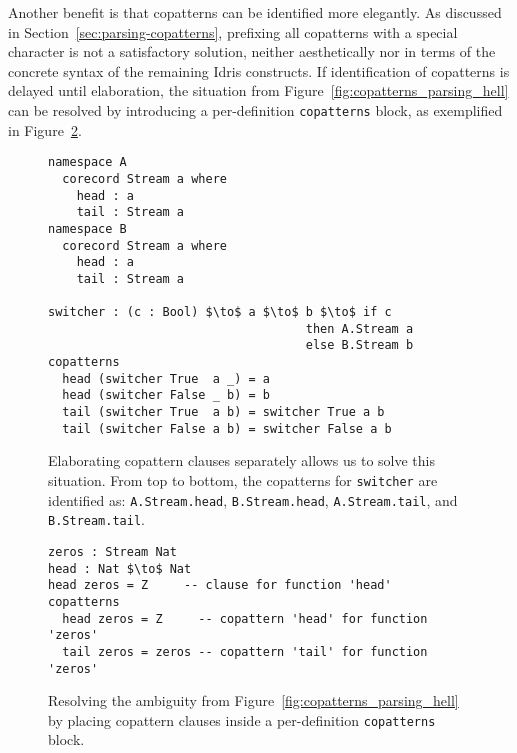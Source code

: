 Another benefit is that copatterns can be identified more
elegantly. As discussed in Section~\ref{sec:parsing-copatterns}, prefixing all
copatterns with a special character is not a satisfactory solution, neither
aesthetically nor in terms of the concrete syntax of the remaining Idris
constructs. If identification of copatterns is delayed until elaboration, the
situation from Figure~\ref{fig:copatterns_parsing_hell} can be resolved by
introducing a per-definition \texttt{copatterns} block, as exemplified in Figure~\ref{fig:copatterns_parsing_hell_fixed_copatterns_block}.
\begin{figure}
\begin{lstlisting}[mathescape]
namespace A
  corecord Stream a where
    head : a
    tail : Stream a
namespace B
  corecord Stream a where
    head : a
    tail : Stream a

switcher : (c : Bool) $\to$ a $\to$ b $\to$ if c
                                    then A.Stream a 
                                    else B.Stream b
copatterns
  head (switcher True  a _) = a
  head (switcher False _ b) = b
  tail (switcher True  a b) = switcher True a b
  tail (switcher False a b) = switcher False a b   
\end{lstlisting}
  \caption{Elaborating copattern clauses separately allows us to solve this
    situation. From top to bottom, the copatterns for \texttt{switcher} are
    identified as: \texttt{A.Stream.head}, \texttt{B.Stream.head},
    \texttt{A.Stream.tail}, and \texttt{B.Stream.tail}.}
  \label{fig:copatterns_type_disambiguation}
\end{figure}

\begin{figure}
\begin{lstlisting}[mathescape]
zeros : Stream Nat
head : Nat $\to$ Nat
head zeros = Z     -- clause for function 'head'
copatterns
  head zeros = Z     -- copattern 'head' for function 'zeros'
  tail zeros = zeros -- copattern 'tail' for function 'zeros'
\end{lstlisting}
  \caption{Resolving the ambiguity from Figure~\ref{fig:copatterns_parsing_hell}
  by placing copattern clauses inside a per-definition \texttt{copatterns} block.}
  \label{fig:copatterns_parsing_hell_fixed_copatterns_block}
\end{figure}


